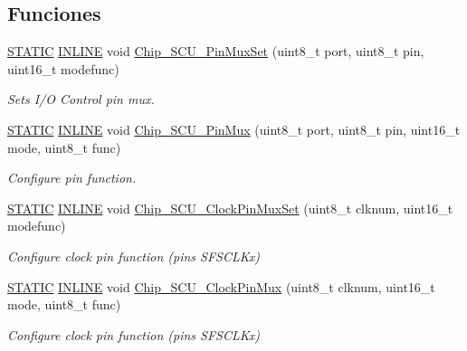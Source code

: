 \subsection*{Funciones}
\begin{DoxyCompactItemize}
\item 
\hyperlink{group___l_p_c___types___public___macros_ga10b2d890d871e1489bb02b7e70d9bdfb}{S\+T\+A\+T\+IC} \hyperlink{spifi__18xx__43xx_8h_a2eb6f9e0395b47b8d5e3eeae4fe0c116}{I\+N\+L\+I\+NE} void \hyperlink{group___s_c_u__18_x_x__43_x_x_gaf7f798c364e281b3aa3247516e0a913e}{Chip\+\_\+\+S\+C\+U\+\_\+\+Pin\+Mux\+Set} (uint8\+\_\+t port, uint8\+\_\+t pin, uint16\+\_\+t modefunc)
\begin{DoxyCompactList}\small\item\em Sets I/O Control pin mux. \end{DoxyCompactList}\item 
\hyperlink{group___l_p_c___types___public___macros_ga10b2d890d871e1489bb02b7e70d9bdfb}{S\+T\+A\+T\+IC} \hyperlink{spifi__18xx__43xx_8h_a2eb6f9e0395b47b8d5e3eeae4fe0c116}{I\+N\+L\+I\+NE} void \hyperlink{group___s_c_u__18_x_x__43_x_x_ga6bca03c66ecebe85cbecd51afb3f0009}{Chip\+\_\+\+S\+C\+U\+\_\+\+Pin\+Mux} (uint8\+\_\+t port, uint8\+\_\+t pin, uint16\+\_\+t mode, uint8\+\_\+t func)
\begin{DoxyCompactList}\small\item\em Configure pin function. \end{DoxyCompactList}\item 
\hyperlink{group___l_p_c___types___public___macros_ga10b2d890d871e1489bb02b7e70d9bdfb}{S\+T\+A\+T\+IC} \hyperlink{spifi__18xx__43xx_8h_a2eb6f9e0395b47b8d5e3eeae4fe0c116}{I\+N\+L\+I\+NE} void \hyperlink{group___s_c_u__18_x_x__43_x_x_ga5ee82d9fd5e174d422df2a2e5baeae88}{Chip\+\_\+\+S\+C\+U\+\_\+\+Clock\+Pin\+Mux\+Set} (uint8\+\_\+t clknum, uint16\+\_\+t modefunc)
\begin{DoxyCompactList}\small\item\em Configure clock pin function (pins S\+F\+S\+C\+L\+Kx) \end{DoxyCompactList}\item 
\hyperlink{group___l_p_c___types___public___macros_ga10b2d890d871e1489bb02b7e70d9bdfb}{S\+T\+A\+T\+IC} \hyperlink{spifi__18xx__43xx_8h_a2eb6f9e0395b47b8d5e3eeae4fe0c116}{I\+N\+L\+I\+NE} void \hyperlink{group___s_c_u__18_x_x__43_x_x_ga9b46fb9a2976c97279e2db19798f4736}{Chip\+\_\+\+S\+C\+U\+\_\+\+Clock\+Pin\+Mux} (uint8\+\_\+t clknum, uint16\+\_\+t mode, uint8\+\_\+t func)
\begin{DoxyCompactList}\small\item\em Configure clock pin function (pins S\+F\+S\+C\+L\+Kx) \end{DoxyCompactList}\item 

\end{DoxyCompactItemize}
